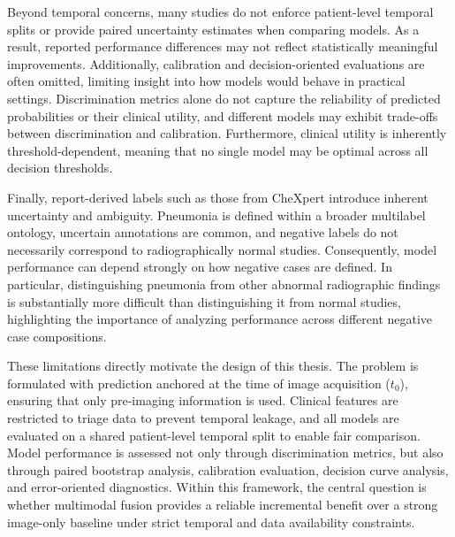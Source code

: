 Beyond temporal concerns, many studies do not enforce patient-level temporal splits or provide paired uncertainty estimates when comparing models. As a result, reported performance differences may not reflect statistically meaningful improvements. Additionally, calibration and decision-oriented evaluations are often omitted, limiting insight into how models would behave in practical settings. Discrimination metrics alone do not capture the reliability of predicted probabilities or their clinical utility, and different models may exhibit trade-offs between discrimination and calibration. Furthermore, clinical utility is inherently threshold-dependent, meaning that no single model may be optimal across all decision thresholds.

Finally, report-derived labels such as those from CheXpert introduce inherent uncertainty and ambiguity. Pneumonia is defined within a broader multilabel ontology, uncertain annotations are common, and negative labels do not necessarily correspond to radiographically normal studies. Consequently, model performance can depend strongly on how negative cases are defined. In particular, distinguishing pneumonia from other abnormal radiographic findings is substantially more difficult than distinguishing it from normal studies, highlighting the importance of analyzing performance across different negative case compositions.

These limitations directly motivate the design of this thesis. The problem is formulated with prediction anchored at the time of image acquisition ($t_0$), ensuring that only pre-imaging information is used. Clinical features are restricted to triage data to prevent temporal leakage, and all models are evaluated on a shared patient-level temporal split to enable fair comparison. Model performance is assessed not only through discrimination metrics, but also through paired bootstrap analysis, calibration evaluation, decision curve analysis, and error-oriented diagnostics. Within this framework, the central question is whether multimodal fusion provides a reliable incremental benefit over a strong image-only baseline under strict temporal and data availability constraints.
